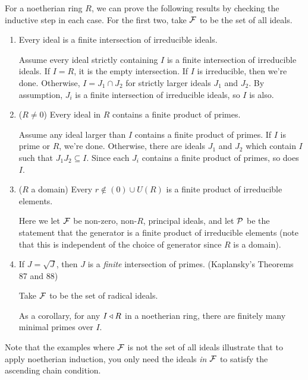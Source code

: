  \begin{example} For a noetherian ring $R$, we can prove the following results by
 checking the inductive step in each case. For the first two, take $\F$ to be the set of
 all ideals.
   \begin{enumerate}
     \item Every ideal is a finite intersection of irreducible ideals.

     Assume every ideal strictly containing $I$ is a finite intersection of irreducible
     ideals. If $I=R$, it is the empty intersection. If $I$ is irreducible, then we're
     done. Otherwise, $I = J_1\cap J_2$ for strictly larger ideals $J_1$ and $J_2$. By
     assumption, $J_i$ is a finite intersection of irreducible ideals, so $I$ is also.

     \item ($R\neq 0$) Every ideal in $R$ contains a finite product of primes.

     Assume any ideal larger than $I$ contains a finite product of primes. If $I$ is
     prime or $R$, we're done. Otherwise, there are ideals $J_1$ and $J_2$ which contain
     $I$ such that $J_1J_2\subseteq I$. Since each $J_i$ contains a finite product of
     primes, so does $I$.

     \item ($R$ a domain) Every $r\not\in (0)\cup U(R)$ is a finite product of
     irreducible elements.

     Here we let $\F$ be non-zero, non-$R$, principal ideals, and let $\P$ be the
     statement that the generator is a finite product of irreducible elements (note that
     this is independent of the choice of generator since $R$ is a domain). 

     \item If $J=\sqrt J$, then $J$ is a \emph{finite} intersection of primes.
     (Kaplansky's Theorems 87 and 88)

     Take $\F$ to be the set of radical ideals.

     As a corollary, for any $I\< R$ in a noetherian ring, there are finitely many
     minimal primes over $I$.
   \end{enumerate}
   \vspace*{-1.7\baselineskip}
 \end{example}
 Note that the examples where $\F$ is not the set of all ideals illustrate that to
 apply noetherian induction, you only need the ideals \emph{in $\F$} to satisfy the
 ascending chain condition.
